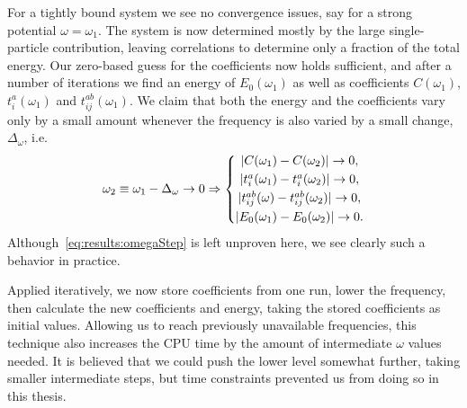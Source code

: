 For a tightly bound system we see no convergence issues, say for a strong potential $\omega = \omega_1$.
The system is now determined mostly by the large single-particle contribution, leaving correlations to determine only a fraction of the total energy.
Our zero-based guess for the coefficients now holds sufficient, and after a number of iterations we find an energy of $E_0(\omega_1)$ as well as coefficients $C(\omega_1)$, $t_i^a(\omega_1)$ and $t_{ij}^{ab}(\omega_1)$.
We claim that both the energy and the coefficients vary only by a small amount  whenever the frequency is also varied by a small change, $\Delta_{\omega}$, i.e.
\begin{equation}
\label{eq:results:omegaStep}
\omega_2 \equiv \omega_1 - \Delta_{\omega} \rightarrow 0 
\Rightarrow 
\left\lbrace
\begin{matrix}
| C(\omega_1) - C(\omega_2) | \rightarrow 0 , \vspace{1mm}\\
| t_i^a(\omega_1) - t_i^a(\omega_2) | \rightarrow 0 ,\vspace{1mm}\\
| t_{ij}^{ab}(\omega) - t_{ij}^{ab}(\omega_2) | \rightarrow 0 ,\vspace{1mm}\\
| E_0(\omega_1) - E_0(\omega_2) | \rightarrow 0 .
\end{matrix}
\right.
\end{equation}
Although~\eqref{eq:results:omegaStep} is left unproven here, we see clearly such a behavior in practice.

Applied iteratively, we now store coefficients from one run, lower the frequency, then calculate the new coefficients and energy, taking the stored coefficients as initial values.
Allowing us to reach previously unavailable frequencies, this technique also increases the CPU time by the amount of intermediate $\omega$ values needed.
It is believed that we could push the lower level somewhat further, taking smaller intermediate steps, but time constraints prevented us from doing so in this thesis.


